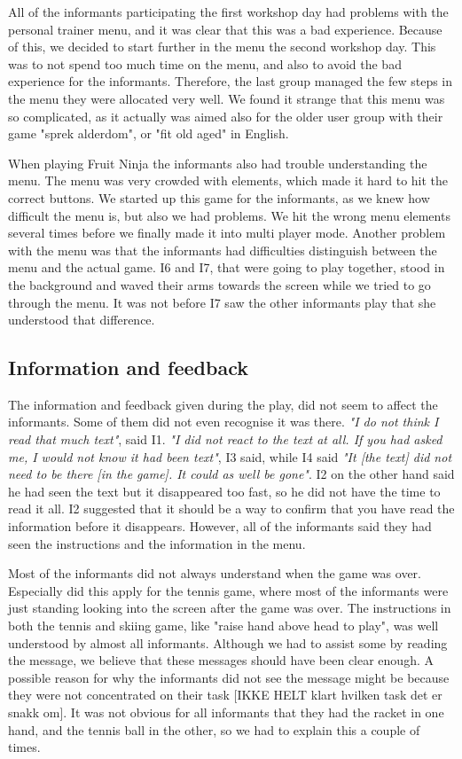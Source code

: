 All of the informants participating the first workshop day had problems with the personal trainer menu, and it was clear that this was a bad experience. Because of this, we decided to start further in the menu the second workshop day. This was to not spend too much time on the menu, and also to avoid the bad experience for the informants. Therefore, the last group managed the few steps in the menu they were allocated very well. We found it strange that this menu was so complicated, as it actually was aimed also for the older user group with their game "sprek alderdom", or "fit old aged" in English. 

When playing Fruit Ninja the informants also had trouble understanding the menu. The menu was very crowded with elements, which made it hard to hit the correct buttons. We started up this game for the informants, as we knew how difficult the menu is, but also we had problems. We hit the wrong menu elements several times  before we finally made it into multi player mode. Another problem with the menu was that the informants had difficulties distinguish between the menu and the actual game. I6 and I7, that were going to play together, stood in the background and waved their arms towards the screen while we tried to go through the menu. It was not before I7 saw the other informants play that she understood that difference. 

\subsection{Information and feedback}
The information and feedback given during the play, did not seem to affect the informants. Some of them did not even recognise it was there. \emph{"I do not think I read that much text"}, said I1. \emph{"I did not react to the text at all. If you had asked me, I would not know it had been text"}, I3 said, while I4 said \emph{"It [the text] did not need to be there [in the game]. It could as well be gone"}. I2 on the other hand said he had seen the text but it disappeared too fast, so he did not have the time to read it all. I2 suggested that it should be a way to confirm that you have read the information before it disappears. However, all of the informants said they had seen the instructions and the information in the menu. 

Most of the informants did not always understand when the game was over. Especially did this apply for the tennis game, where most of the informants were just standing looking into the screen after the game was over.  The instructions in both the tennis and skiing game, like "raise hand above head to play", was well understood by almost all informants. Although we had to assist some by reading the message, we believe that these messages should have been clear enough. A possible reason for why the informants did not see the message might be because they were not concentrated on their task [IKKE HELT klart hvilken task det er snakk om]. It was not obvious for all informants that they had the racket in one hand, and the tennis ball in the other, so we had to explain this a couple of times. 


